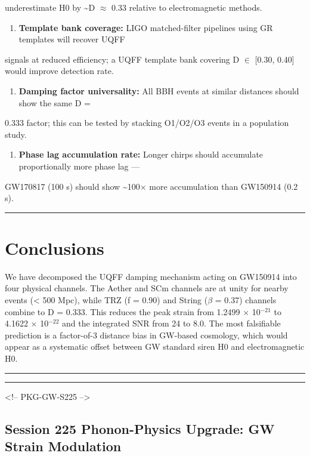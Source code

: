 \documentclass[12pt,a4paper]{article}
\begin{document}
underestimate H0 by \textasciitilde{}D $\approx$ 0.33 relative to electromagnetic methods.

\begin{enumerate}
  \item \textbf{Template bank coverage:} LIGO matched-filter pipelines using GR templates will recover UQFF
\end{enumerate}

signals at reduced efficiency; a UQFF template bank covering D $\in$ [0.30, 0.40] would improve detection rate.

\begin{enumerate}
  \item \textbf{Damping factor universality:} All BBH events at similar distances should show the same D =
\end{enumerate}

0.333 factor; this can be tested by stacking O1/O2/O3 events in a population study.

\begin{enumerate}
  \item \textbf{Phase lag accumulation rate:} Longer chirps should accumulate proportionally more phase lag ---
\end{enumerate}

GW170817 (100 s) should show \textasciitilde{}100$\times$ more accumulation than GW150914 (0.2 s).

\medskip\hrule\medskip

\section{Conclusions}

We have decomposed the UQFF damping mechanism acting on GW150914 into four physical channels. The Aether and SCm channels are at unity for nearby events (< 500 Mpc), while TRZ (f = 0.90) and String ($\beta$ = 0.37) channels combine to D = 0.333. This reduces the peak strain from 1.2499 $\times$ 10$^{-21}$ to 4.1622 $\times$ 10$^{-22}$ and the integrated SNR from 24 to 8.0. The most falsifiable prediction is a factor-of-3 distance bias in GW-based cosmology, which would appear as a systematic offset between GW standard siren H0 and electromagnetic H0.

\medskip\hrule\medskip

\medskip\hrule\medskip

<!-- PKG-GW-S225 -->

\subsection{Session 225 Phonon-Physics Upgrade: GW Strain Modulation}
\end{document}
